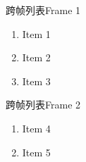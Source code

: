\documentclass{ctexbeamer}
\newcounter{currentenumi}
\begin{document}
\begin{frame}{跨帧列表}{Frame 1}
  \begin{enumerate}
    \item Item 1
    \item Item 2
    \item Item 3
    \setcounter{currentenumi}{\theenumi}
  \end{enumerate}
\end{frame}

\begin{frame}{跨帧列表}{Frame 2}
  \begin{enumerate}
    \setcounter{enumi}{\thecurrentenumi}
    \item Item 4
    \item Item 5
  \end{enumerate}
\end{frame}
\end{document}
